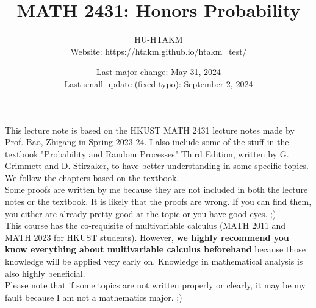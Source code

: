 \documentclass{huhtakm-template-book}
\title{MATH 2431: Honors Probability}
\author{
	HU-HTAKM\\
	Website: \url{https://htakm.github.io/htakm_test/}
}
\date{
	Last major change: May 31, 2024\\
	Last small update (fixed typo): September 2, 2024
}
\begin{document}
\maketitle
This lecture note is based on the HKUST MATH 2431 lecture notes made by Prof. Bao, Zhigang in Spring 2023-24. I also include some of the stuff in the textbook "Probability and Random Processes" Third Edition, written by G. Grimmett and D. Stirzaker, to have better understanding in some specific topics. We follow the chapters based on the textbook.\\
Some proofs are written by me because they are not included in both the lecture notes or the textbook. It is likely that the proofs are wrong. If you can find them, you either are already pretty good at the topic or you have good eyes. ;)\\
This course has the co-requisite of multivariable calculus (MATH 2011 and MATH 2023 for HKUST students). However, \textbf{we highly recommend you know everything about multivariable calculus beforehand} because those knowledge will be applied very early on. Knowledge in mathematical analysis is also highly beneficial.\\
Please note that if some topics are not written properly or clearly, it may be my fault because I am not a mathematics major. ;)
\end{document}
